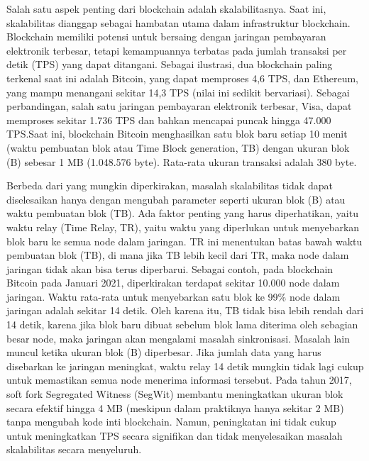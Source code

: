 Salah satu aspek penting dari blockchain adalah skalabilitasnya. Saat ini,
skalabilitas dianggap sebagai hambatan utama dalam infrastruktur blockchain.
Blockchain memiliki potensi untuk bersaing dengan jaringan pembayaran
elektronik terbesar, tetapi kemampuannya terbatas pada jumlah transaksi per
detik (TPS) yang dapat ditangani. Sebagai ilustrasi, dua blockchain paling
terkenal saat ini adalah Bitcoin, yang dapat memproses 4,6 TPS, dan Ethereum,
yang mampu menangani sekitar 14,3 TPS (nilai ini sedikit bervariasi). Sebagai
perbandingan, salah satu jaringan pembayaran elektronik terbesar, Visa, dapat
memproses sekitar 1.736 TPS dan bahkan mencapai puncak hingga 47.000 TPS.Saat
ini, blockchain Bitcoin menghasilkan satu blok baru setiap 10 menit (waktu
pembuatan blok atau Time Block generation, TB) dengan ukuran blok (B) sebesar 1
MB (1.048.576 byte). Rata-rata ukuran transaksi adalah 380 byte.

Berbeda dari yang mungkin diperkirakan, masalah skalabilitas tidak dapat
diselesaikan hanya dengan mengubah parameter seperti ukuran blok (B) atau waktu
pembuatan blok (TB). Ada faktor penting yang harus diperhatikan, yaitu waktu
relay (Time Relay, TR), yaitu waktu yang diperlukan untuk menyebarkan blok baru
ke semua node dalam jaringan. TR ini menentukan batas bawah waktu pembuatan
blok (TB), di mana jika TB lebih kecil dari TR, maka node dalam jaringan tidak
akan bisa terus diperbarui. Sebagai contoh, pada blockchain Bitcoin pada
Januari 2021, diperkirakan terdapat sekitar 10.000 node dalam jaringan. Waktu
rata-rata untuk menyebarkan satu blok ke 99\% node dalam jaringan adalah
sekitar 14 detik. Oleh karena itu, TB tidak bisa lebih rendah dari 14 detik,
karena jika blok baru dibuat sebelum blok lama diterima oleh sebagian besar
node, maka jaringan akan mengalami masalah sinkronisasi. Masalah lain muncul
ketika ukuran blok (B) diperbesar. Jika jumlah data yang harus disebarkan ke
jaringan meningkat, waktu relay 14 detik mungkin tidak lagi cukup untuk
memastikan semua node menerima informasi tersebut. Pada tahun 2017, soft fork
Segregated Witness (SegWit) membantu meningkatkan ukuran blok secara efektif
hingga 4 MB (meskipun dalam praktiknya hanya sekitar 2 MB) tanpa mengubah kode
inti blockchain. Namun, peningkatan ini tidak cukup untuk meningkatkan TPS
secara signifikan dan tidak menyelesaikan masalah skalabilitas secara
menyeluruh.
